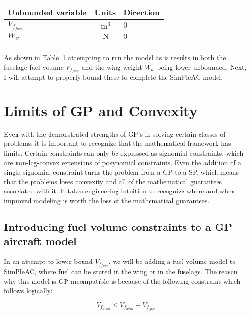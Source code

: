 \begin{footnotesize}
\begin{table}
\begin{tabular}{ l c l }
    \toprule
	Unbounded variable & Units & Direction \\
    \midrule
    $V_{f_{fuse}}$ &  $~\mathrm{m^3}$  & $0$ \\
    $W_w$ & $~\mathrm{N}$  & $0$ \\
    \bottomrule
\label{tab:WLTD_unbounded}
\end{tabular}
\end{table} \end{footnotesize}

As shown in Table~\ref{tab:WLTD_unbounded} attempting to run the model as is
results in both the fuselage fuel
volume $V_{f_{fuse}}$ and the wing weight $W_w$ being lower-unbounded. Next,
I will attempt to properly bound these to complete the SimPleAC model.

\section{Limits of GP and Convexity} \label{s:GPLimits}

Even with the demonstrated strengths of \gls{GP}'s in solving certain classes of 
problems, it is important to recognize that the mathematical framework has limits. 
Certain constraints can only be expressed as signomial constraints, which are 
non-log-convex extensions of posynomial constraints. Even the addition of a single 
signomial constraint turns the problem from a \gls{GP} to a \gls{SP}, which means
that the problems loses convexity and all of the mathematical guarantees associated with it. 
It takes engineering intuition to recognize where and when improved modeling is worth
the loss of the mathematical guarantees.

\subsection{Introducing fuel volume constraints to a GP aircraft model}

In an attempt to lower bound $V_{f_{fuse}}$, we will
be adding a fuel volume model to SimPleAC, where fuel can be stored in the wing or
in the fuselage. The reason why this model is \gls{GP}-incompatible is because of the
following constraint which follows logically:

\begin{equation}
	V_{f_{avail}} \leq V_{f_{wing}} + V_{f_{fuse}}
	\label{vfavail}
\end{equation}

